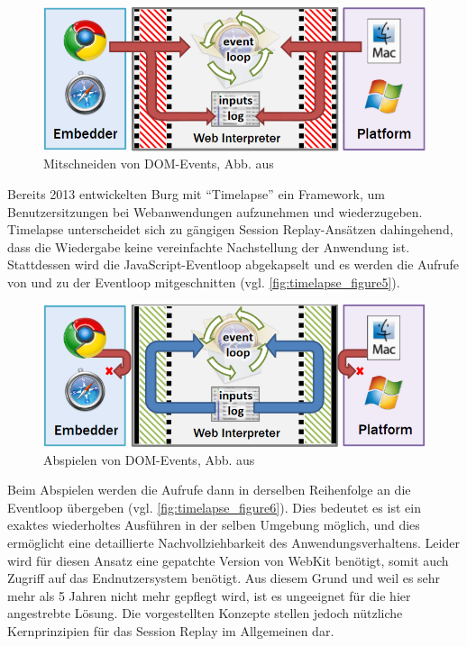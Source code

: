 \begin{figure}
\centering
\includegraphics[width=\linewidth]{img/03_methoden/timelapse_figure5.png}
\caption{Mitschneiden von DOM-Events, Abb. aus \cite{TimelapsePaper}}
\label{fig:timelapse_figure5}
\end{figure}

Bereits 2013 entwickelten Burg \etal \cite{TimelapsePaper} mit \enquote{Timelapse} ein Framework, um Benutzersitzungen bei Webanwendungen aufzunehmen und wiederzugeben. Timelapse unterscheidet sich zu gängigen Session Replay-Ansätzen dahingehend, dass die Wiedergabe keine vereinfachte Nachstellung der Anwendung ist. Stattdessen wird die JavaScript-Eventloop abgekapselt und es werden die Aufrufe von und zu der Eventloop mitgeschnitten (vgl. \autoref{fig:timelapse_figure5}).

\begin{figure}
\centering
\includegraphics[width=\linewidth]{img/03_methoden/timelapse_figure6.png}
\caption{Abspielen von DOM-Events, Abb. aus \cite{TimelapsePaper}}
\label{fig:timelapse_figure6}
\end{figure}

Beim Abspielen werden die Aufrufe dann in derselben Reihenfolge an die Eventloop übergeben (vgl. \autoref{fig:timelapse_figure6}). Dies bedeutet es ist ein exaktes wiederholtes Ausführen in der selben Umgebung möglich, und dies ermöglicht eine detaillierte Nachvollziehbarkeit des Anwendungsverhaltens. Leider wird für diesen Ansatz eine gepatchte Version von WebKit benötigt, somit auch Zugriff auf das Endnutzersystem benötigt. Aus diesem Grund und weil es sehr mehr als 5 Jahren nicht mehr gepflegt wird\footnotemark{}, ist es ungeeignet für die hier angestrebte Lösung. Die vorgestellten Konzepte stellen jedoch nützliche Kernprinzipien für das Session Replay im Allgemeinen dar.


